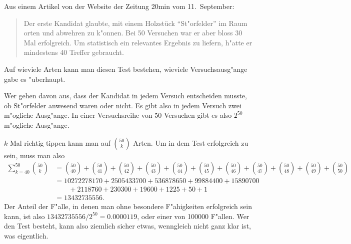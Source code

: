Aus einem Artikel von der Website der Zeitung 20min vom 11.~September:
\begin{quotation}
Der erste Kandidat glaubte, mit einem Holzstück ``St"orfelder'' im Raum
orten und abwehren zu k"onnen.
Bei 50 Versuchen war er aber bloss 30 Mal erfolgreich. Um statistisch
ein relevantes Ergebnis zu liefern, h"atte er mindestens 40 Treffer gebraucht.
\end{quotation}
Auf wieviele Arten kann man diesen Test bestehen, wieviele Versuchsausg"ange
gabe es "uberhaupt.

\begin{loesung}
Wer gehen davon aus, dass der Kandidat in jedem Versuch entscheiden musste,
ob St"orfelder anwesend waren oder nicht. Es gibt also in jedem Versuch
zwei m"ogliche Ausg"ange. In einer Versuchsreihe von 50 Versuchen gibt
es also $2^{50}$ m"ogliche Ausg"ange.

$k$ Mal richtig tippen kann man auf
$\binom{50}{k}$ Arten. Um in dem Test erfolgreich zu sein, muss man also
\begin{align*}
\sum_{k=40}^{50}\binom{50}{k}
&=
\binom{50}{40}
+
\binom{50}{41}
+
\binom{50}{42}
+
\binom{50}{43}
+
\binom{50}{44}
+
\binom{50}{45}
+
\binom{50}{46}
+
\binom{50}{47}
+
\binom{50}{48}
+
\binom{50}{49}
+
\binom{50}{50}
\\
&=
10272278170
+
2505433700
+
536878650
+
99884400
+
15890700
\\
&\qquad+
2118760
+
230300
+
19600
+
1225
+
50
+
1
\\
&=13432735556.
\end{align*}
Der Anteil der F"alle, in denen man ohne besondere F"ahigkeiten 
erfolgreich sein kann, ist also $13432735556/2^{50}=0.0000119$,
oder einer von 100000 F"allen. Wer den Test besteht, kann also ziemlich
sicher etwas, wenngleich nicht ganz klar ist, was eigentlich.
\end{loesung}
